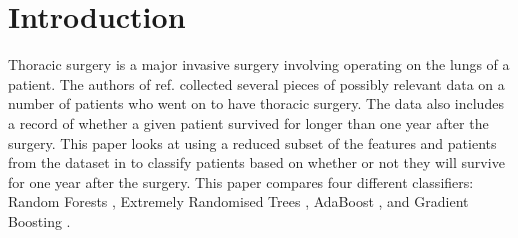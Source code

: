 \documentclass[journal]{IEEEtran}
\begin{document}




\maketitle









%
\IEEEpeerreviewmaketitle

\section{Introduction}
Thoracic surgery is a major invasive surgery involving operating on the lungs of a patient. The authors of ref. \cite{zikeba2014boosted} collected several pieces of possibly relevant data on a number of patients who went on to have thoracic surgery. The data also includes a record of whether a given patient survived for longer than one year after the surgery. This paper looks at using a reduced subset of the features and patients from the dataset in \cite{zikeba2014boosted} to classify patients based on whether or not they will survive for one year after the surgery. This paper compares four different classifiers: Random Forests \cite{breiman2001random}, Extremely Randomised Trees \cite{geurts2006extremely}, AdaBoost \cite{freund1997decision}, and Gradient Boosting \cite{natekin2013gradient}. 
\end{document}
